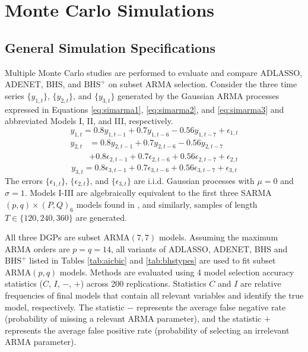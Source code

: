 \section{Monte Carlo Simulations}
\label{sec:mc}

\subsection{General Simulation Specifications}
Multiple Monte Carlo studies are performed to evaluate and compare ADLASSO, ADENET, BHS, and $\textrm{BHS}^+$ on subset ARMA selection. Consider the three time series $\{y_{1,t}\}$, $\{y_{2,t}\}$, and $\{y_{3,t}\}$ generated by the Gaussian ARMA processes expressed in Equations \ref{eq:simarma1}, \ref{eq:simarma2}, and \ref{eq:simarma3} and abbreviated Models I, II, and III, respectively.
\begin{equation}
	\label{eq:simarma1}
	y_{1,t}=0.8y_{1,t-1}+0.7y_{1,t-6}-0.56y_{1,t-7}+\epsilon_{1,t}
\end{equation}
\begin{equation}
	\begin{split}
	\label{eq:simarma2}
	y_{2,t}&=0.8y_{2,t-1}+0.7y_{2,t-6}-0.56y_{2,t-7}\\
	&+0.8\epsilon_{2,t-1}+0.7\epsilon_{2,t-6}+0.56\epsilon_{2,t-7}+\epsilon_{2,t}
	\end{split}
\end{equation}
\begin{equation}
	\label{eq:simarma3}
	y_{3,t}=0.8\epsilon_{3,t-1}+0.7\epsilon_{3,t-6}+0.56\epsilon_{3,t-7}+\epsilon_{3,t}
\end{equation}
The errors $\{\epsilon_{1,t}\}$, $\{\epsilon_{2,t}\}$, and $\{\epsilon_{3,t}\}$ are i.i.d. Gaussian processes with $\mu=0$ and $\sigma=1$. Models I-III are algebraically equivalent to the first three SARMA$(p,q)\times(P,Q)_6$ models found in \cite{Chen2011}, and similarly, samples of length $T\in \{120, 240, 360\}$ are generated. 

All three DGPs are subset ARMA$(7,7)$ models. Assuming the maximum ARMA orders are $p=q=14$, all variants of ADLASSO, ADENET, BHS and $\textrm{BHS}^+$ listed in Tables \ref{tab:aicbic} and \ref{tab:bhstypes} are used to fit subset ARMA$(p,q)$ models. Methods are evaluated using 4 model selection accuracy statistics ($C$, $I$, $-$, $+$) across 200 replications. Statistics $C$ and $I$ are relative frequencies of final models that contain all relevant variables and identify the true model, respectively. The statistic $-$ represents the average false negative rate (probability of missing a relevant ARMA parameter), and the statistic $+$ represents the average false positive rate (probability of selecting an irrelevant ARMA parameter).

